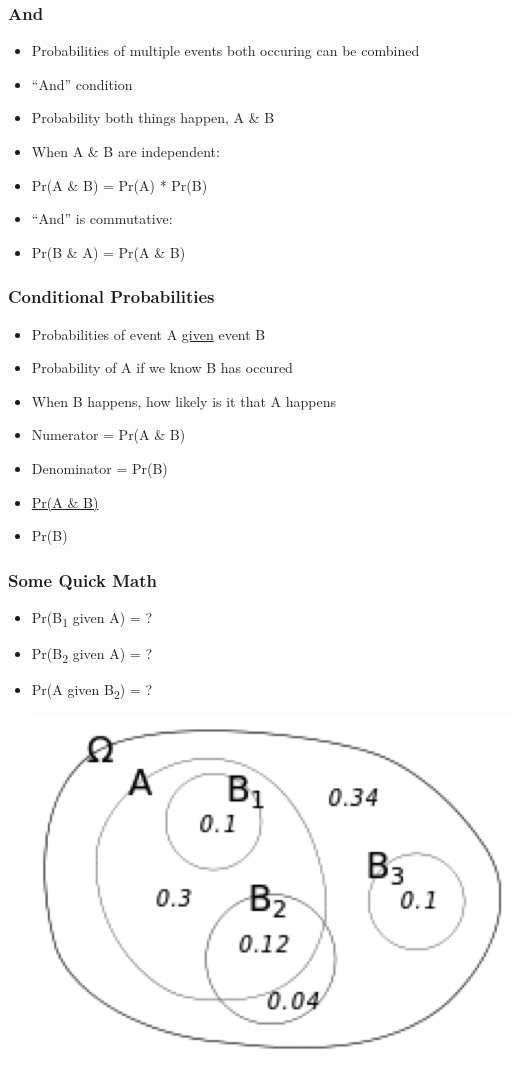 \documentclass[14pt,handout]{beamer}
\begin{document}
\begin{frame}
\frametitle{And}
\begin{itemize}
	\item<+-> Probabilities of multiple events both occuring can be combined
	\item<+-> ``And'' condition
	\item<+-> Probability both things happen, A \& B
	\item<+-> When A \& B are independent:
	\item<+-> Pr(A \& B) = Pr(A) * Pr(B)
	\item<+-> ``And'' is commutative:
	\item<+-> Pr(B \& A) = Pr(A \& B)
\end{itemize}
\end{frame}

\begin{frame}
\frametitle{Conditional Probabilities}
\begin{itemize}
	\item<+-> Probabilities of event A \underline{given} event B
	\item<+-> Probability of A if we know B has occured
	\item<+-> When B happens, how likely is it that A happens
	\item<+-> Numerator = Pr(A \& B)
	\item<+-> Denominator = Pr(B)
	\item[] \underline{Pr(A \& B)}
	\item[] Pr(B)
\end{itemize}
\end{frame}

\begin{frame}
\frametitle{Some Quick Math}
\begin{itemize}
	\item[] Pr(B\textsubscript{1} given A) = ?
	\item[] Pr(B\textsubscript{2} given A) = ?
	\item[] Pr(A given B\textsubscript{2}) = ?
	\begin{center}
	\includegraphics[width=.7\textwidth]{images_20171128_condtionalprobs.png}
	\end{center}
\end{itemize}
\end{frame}
\end{document}
